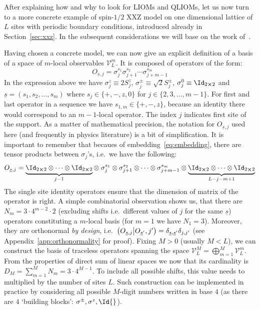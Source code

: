 After explaining how and why to look for LIOMs and QLIOMs, let us now turn to a more concrete
example of spin-\(1/2\) XXZ model on one dimensional lattice of \(L\) sites with periodic
boundary conditions, introduced already in Section~\ref{sec:xxz}. In the subsequent
considerations we will base on the work of~\textcite{Mierzejewski2015a}.

Having chosen a concrete model, we can now give an explicit definition of a basis
of a space of \(m\)-local observables \(\mathcal{V}_L^m\). It is composed of operators
of the form:
\begin{equation}
  O_{\underline{s},j}=\sigma_{j}^{s_{1}} \sigma_{j+1}^{s_{2}} \cdots 
  \sigma_{j+m-1}^{s_{m}}
  \label{eq:basis operator}
\end{equation}
In the expression above we have \(\sigma_j^z \equiv 2 S^z_j\),
\(\sigma_j^{\pm} \equiv \sqrt{2} S_j^{\pm}\), \(\sigma^{0}_j \equiv \Id_{2\cross 2}\) and
 \(\underline{s} = \left(s_1, s_2,\ldots, s_m\right)\) where \(s_j \in \{+,-,z,0\}\) for
 \(j \in \{2,3,\ldots,m-1\}\). For first and last operator in a sequence we have 
 \(s_{1,m} \in \{+,-,z\}\), because an identity there would correspond to an \(m-1\)-local
 operator. The index \(j\) indicates first site of the support.
As a matter of mathematical precision, the notation for \(O_{\underline{s},j}\) used here 
(and frequently in physics literature) is a bit of simplification. It is important to remember
that becaues of embedding~\eqref{eq:embedding}, there are tensor products between \(\sigma_j\)'s, i.e.\ we have the following:
\begin{equation}
  O_{\underline{s},j}= \underbrace{\Id_{2\cross 2} \otimes \cdots
       \otimes \Id_{2\cross 2}}_{j-1} \otimes \; \sigma_{j}^{s_{1}} \otimes \sigma_{j+1}^{s_{2}} \otimes
        \cdots \otimes \sigma_{j+m-1}^{s_{m}} \otimes 
        \underbrace{\Id_{2\cross 2} \otimes \cdots \otimes \Id_{2\cross 2}}_{L-j-m+1}
        \label{eq:basis with tensors}
\end{equation}
The single site identity operators ensure that the dimension of matrix of the operator is right.
A simple combinatorial observation shows us, that there are \(N_m = 3\cdot 4^{m-2}\cdot 2\)
(excluding shifts i.e.\ different values of \(j\) for the same \(\underline{s}\)) operators
constituting a \(m\)-local basis (for \(m = 1\) we have \(N_1 = 3\)). Moreover, they are orthonormal
\textit{by design}, i.e.\ \(\left(O_{\underline{s},j} \middle| O_{\underline{s}^{\prime}},j^{\prime}\right) =
\delta_{\underline{s},\underline{s}^{\prime}}\delta_{j,j^{\prime}}\) (see Appendix~\ref{app:orthonormality} for proof).
Fixing \(M>0\) (usually \(M<L\)), we can construct the basis of traceless operators spanning
the space \(\mathcal{V}_L^M = \bigoplus_{m=1}^{M} \mathcal{V}_L^m\). From the properties of 
direct sum of linear spaces we now that its cardinality is \(D_M = \sum_{m=1}^{M} N_m = 
 3 \cdot 4^{M-1}\). To include all possible shifts, this value needs to multiplied by
 the number of sites \(L\). Such construction can be implemented in practice by considering
 all possible \(M\)-digit numbers written in base \(4\) (as there are \(4\) `building blocks':
  \(\sigma^{\pm},\sigma^{z},\Id{}\)). 

